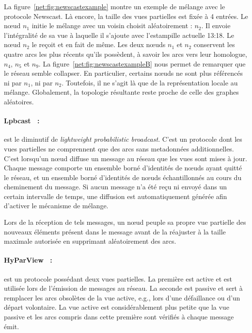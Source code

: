 \noindent La figure~\ref{net:fig:newscastexample} montre un exemple de mélange
avec le protocole Newscast. Là encore, la taille des vues partielles est fixée à
4 entrées. Le nœud $n_1$ initie le mélange avec un voisin choisit aléatoirement
: $n_2$. Il envoie l'intégralité de sa vue à laquelle il s'ajoute avec
l'estampille actuelle 13:18. Le nœud $n_2$ le reçoit et en fait de même. Les
deux nœuds $n_1$ et $n_2$ conservent les quatre arcs les plus récents qu'ils
possèdent, à savoir les arcs vers leur homologue, $n_4$, $n_5$ et $n_9$. La
figure~\ref{net:fig:newscastexampleB} nous permet de remarquer que le réseau
semble collapser. En particulier, certains nœuds ne sont plus référencés ni par
$n_1$, ni par $n_2$. Toutefois, il ne s'agit là que de la représentation locale
au mélange. Globalement, la topologie résultante reste proche de celle des
graphes aléatoires.

\paragraph{Lpbcast~\cite{eugster2003lightweight} :} est le diminutif de
\emph{lightweight probabilistic broadcast}. C'est un protocole dont les vues
partielles ne comprennent que des arcs sans metadonnées additionnelles. C'est
lorsqu'un nœud diffuse un message au réseau que les vues sont mises à
jour. Chaque message comporte un ensemble borné d'identités de nœuds ayant
quitté le réseau, et un ensemble borné d'identités de nœuds échantillonnés au
cours du cheminement du message. Si aucun message n'a été reçu ni envoyé dans un
certain intervalle de temps, une diffusion est automatiquement générée afin
d'activer le mécanisme de mélange.

\noindent Lors de la réception de tels messages, un nœud peuple sa propre vue
partielle des nouveaux éléments présent dans le message avant de la réajuster à
la taille maximale autorisée en supprimant aléatoirement des arcs.

\paragraph{HyParView~\cite{leitao2007dependable} :} est un protocole possédant
deux vues partielles. La première est active et est utilisée lors de l'émission
de messages au réseau. La seconde est passive et sert à remplacer les arcs
obsolètes de la vue active, e.g., lors d'une défaillance ou d'un départ
volontaire.  La vue active est considérablement plus petite que la vue passive
et les arcs compris dans cette première sont vérifiés à chaque message émit.

